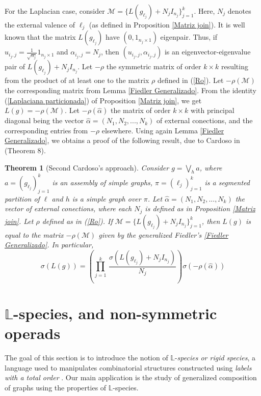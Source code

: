 \documentclass[11pt]{article}
\newtheorem{theorem}{Theorem}[section]
\theoremstyle{definition}
\begin{document}
For the Laplacian case, consider $\mathcal{M}=\{L(g_{\ell_j})+ N_jI_{n_j}\}^k_{j=1}$. Here, $N_j$ denotes the external valence of $\ell_j$ (as defined in Proposition \ref{Matriz join}). It is well known that the matrix $L(g_{\ell_j})$ have
$(0, 1_{n_j\times 1})$ eigenpair. Thus, if $u_{i_j, j}=\frac{1}{\sqrt{n_j}}1_{n_j\times 1}$ and $\alpha_{i_j, j}=N_j$, then $(u_{i_j, j}, \alpha_{i_j, j})$ is an eigenvector-eigenvalue pair of $L(g_{\ell_j})+ N_jI_{n_j}$. Let $-\rho$ the symmetric matrix of order $k\times k$ resulting from the product of at least one to the matrix $\rho$ defined in (\ref{Ro}). Let $-\rho(\mathcal{M})$ the corresponding matrix from Lemma \ref{Fiedler Generalizado}. From the identity (\ref{Laplaciana particionada}) of Proposition \ref{Matriz join}, we get $L(g)=-\rho(\mathcal{M})$. Let $-\rho(\hat{\alpha})$ the matrix of order $k\times k$ with principal diagonal being the vector $\hat{\alpha}=(N_1, N_2,..., N_k)$ of external conections, and the corresponding entries from $-\rho$ elsewhere. Using again Lemma \ref{Fiedler Generalizado}, we obtains a proof of the following result, due to Cardoso in \cite{Cardoso2013} (Theorem 8).

\begin{theorem}[Second Cardoso's approach]\label{2.19}
Consider $g=\displaystyle{\bigvee_h a}$, where $a=(g_{\ell_j})^k_{j=1}$ is an assembly of simple graphs, $\pi=(\ell_j)^k_{j=1}$ is a segmented
partition of $\ell$ and $h$ is a simple graph over $\pi$. Let $\hat{\alpha}=(N_1, N_2,...,N_k)$ the vector of external conections, where each $N_j$ is
defined as in Proposition \ref{Matriz join}. Let $\rho$ defined as in (\ref{Ro}). If $\mathcal{M}=\{L(g_{\ell_j})+ N_jI_{n_j}\}^k_{j=1}$, then $L(g)$
is equal to the matrix $-\rho(\mathcal{M})$ given by the generalized Fiedler's \ref{Fiedler Generalizado}. In particular,
\begin{equation}\label{espectro laplaciano}
\sigma(L(g))=\left(\prod_{j=1}^{k}\,\dfrac{\sigma(L(g_{\ell_j})+ N_jI_{n_j})}{N_j}\right) \sigma(-\rho(\hat{\alpha}))
\end{equation}
\end{theorem}

\section{$\mathbb{L}$-species, and non-symmetric operads}
The goal of this section is to introduce the notion of $\mathbb{L}$-\emph{species or rigid species}, a language used to manipulates combinatorial structures constructed using \emph{labels with a total order} \cite{SpeciesBook,LibroMiguel2015}. Our main application is the study of generalized composition of graphs using the properties of $\mathbb{L}$-species.
\end{document}
